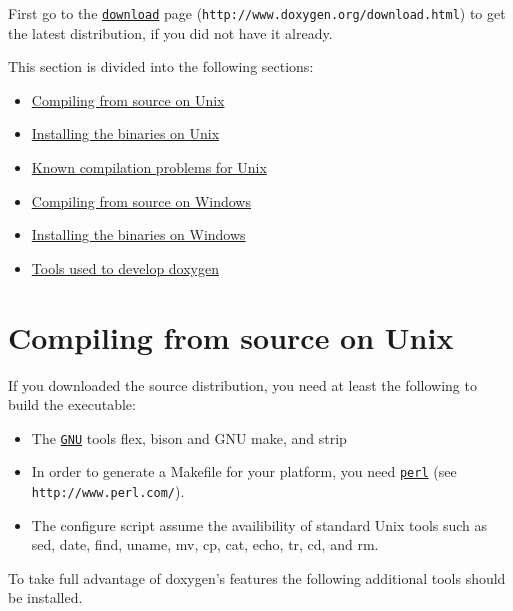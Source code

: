  First go to the \href{http://www.doxygen.org/download.html}{\tt download} page  ({\tt http://www.doxygen.org/download.html}) to get the latest distribution, if you did not have it already.

This section is divided into the following sections: \begin{itemize}
\item \hyperlink{install_install_src_unix}{Compiling from source on Unix} \item \hyperlink{install_install_bin_unix}{Installing the binaries on Unix} \item \hyperlink{install_unix_problems}{Known compilation problems for Unix} \item \hyperlink{install_install_src_windows}{Compiling from source on Windows} \item \hyperlink{install_install_bin_windows}{Installing the binaries on Windows} \item \hyperlink{install_build_tools}{Tools used to develop doxygen} \end{itemize}
\hypertarget{install_install_src_unix}{}\section{Compiling from source on Unix}\label{install_install_src_unix}
If you downloaded the source distribution, you need at least the following to build the executable: \begin{itemize}
\item The \href{ftp://prep.ai.mit.edu/pub/gnu/}{\tt GNU} tools flex, bison and GNU make, and strip     \item In order to generate a Makefile for your platform, you need \href{http://www.perl.com/}{\tt perl}  (see {\tt http://www.perl.com/}).  \item The configure script assume the availibility of standard Unix tools such as sed, date, find, uname, mv, cp, cat, echo, tr, cd, and rm. \end{itemize}


To take full advantage of doxygen's features the following additional tools should be installed.

